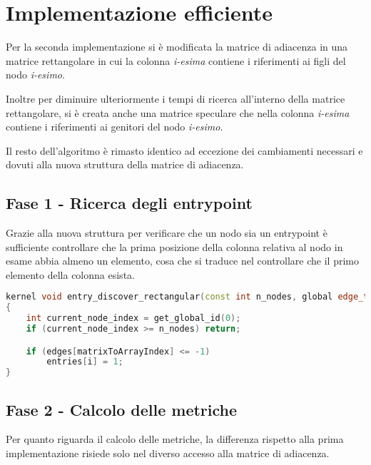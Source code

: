 \documentclass[../relazione.tex]{subfiles}
\begin{document}
\section{Implementazione efficiente}
Per la seconda implementazione si è modificata la matrice di adiacenza in una matrice rettangolare in cui la colonna \textit{i-esima} contiene i riferimenti ai figli del nodo \textit{i-esimo}.

Inoltre per diminuire ulteriormente i tempi di ricerca all'interno della matrice rettangolare, si è creata anche una matrice speculare che nella colonna \textit{i-esima} contiene i riferimenti ai genitori del nodo \textit{i-esimo}.

Il resto dell'algoritmo è rimasto identico ad eccezione dei cambiamenti necessari e dovuti alla nuova struttura della matrice di adiacenza.

\subsection{Fase 1 - Ricerca degli entrypoint}
Grazie alla nuova struttura per verificare che un nodo sia un entrypoint è sufficiente controllare che la prima posizione della colonna relativa al nodo in esame abbia almeno un elemento, cosa che si traduce nel controllare che il primo elemento della colonna esista. 
\begin{lstlisting}[language=C++, caption={Find entrypoints kernel II},captionpos=b]
kernel void entry_discover_rectangular(const int n_nodes, global edge_t* restrict edges, volatile global int* n_entries, global int* entries)
{
	int current_node_index = get_global_id(0);
	if (current_node_index >= n_nodes) return;

	if (edges[matrixToArrayIndex] <= -1)
		entries[i] = 1;
}
\end{lstlisting}

\subsection{Fase 2 - Calcolo delle metriche}
Per quanto riguarda il calcolo delle metriche, la differenza rispetto alla prima implementazione risiede solo nel diverso accesso alla matrice di adiacenza.
\end{document}
